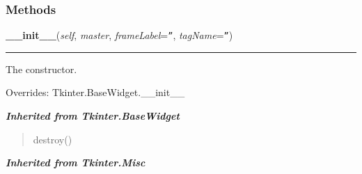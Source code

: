 
  \subsubsection{Methods}

    \vspace{0.5ex}

\hspace{.8\funcindent}\begin{boxedminipage}{\funcwidth}

    \raggedright \textbf{\_\_init\_\_}(\textit{self}, \textit{master}, \textit{frameLabel}={\tt ''}, \textit{tagName}={\tt ''})

    \vspace{-1.5ex}

    \rule{\textwidth}{0.5\fboxrule}
\setlength{\parskip}{2ex}
    The constructor.

\setlength{\parskip}{1ex}
      Overrides: Tkinter.BaseWidget.\_\_init\_\_

    \end{boxedminipage}


\large{\textbf{\textit{Inherited from Tkinter.BaseWidget}}}

\begin{quote}
destroy()
\end{quote}

\large{\textbf{\textit{Inherited from Tkinter.Misc}}}

